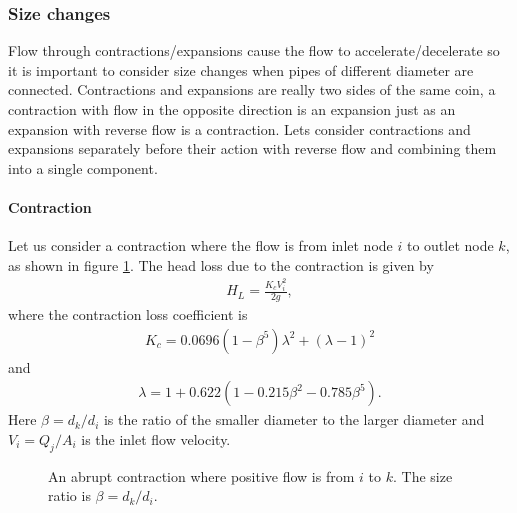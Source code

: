 \subsubsection{Size changes}

Flow through contractions/expansions cause the flow to accelerate/decelerate so it is important to consider size changes when pipes of different diameter are connected. Contractions and expansions are really two sides of the same coin, a contraction with flow in the opposite direction is an expansion just as an expansion with reverse flow is a contraction. Lets consider contractions and expansions separately before their action with reverse flow and combining them into a single component.  

\paragraph{Contraction}

Let us consider a contraction where the flow is from inlet node $i$ to outlet node $k$, as shown in figure \ref{fig:contraction_diagram}. The head loss due to the contraction \cite{rennels22} is given by
\begin{align}
H_L = \frac{K_c V_i^2}{2g},
\end{align}
where the contraction loss coefficient is
\begin{align*}
K_c = 0.0696 \left( 1 - \beta^5 \right) \lambda^2 + \left( \lambda - 1 \right)^2
\end{align*}
and
\begin{align*}
\lambda = 1 + 0.622 \left( 1 - 0.215 \beta^2 - 0.785 \beta^5 \right).
\end{align*}
Here $\beta = d_k / d_i$ is the ratio of the smaller diameter to the larger diameter and $V_i = Q_j / A_i$ is the inlet flow velocity. 

\begin{figure}
\centering
{} 
\caption{An abrupt contraction where positive flow is from $i$ to $k$. The size ratio is $\beta = d_k / d_i$.}
\label{fig:contraction_diagram}
\end{figure}

